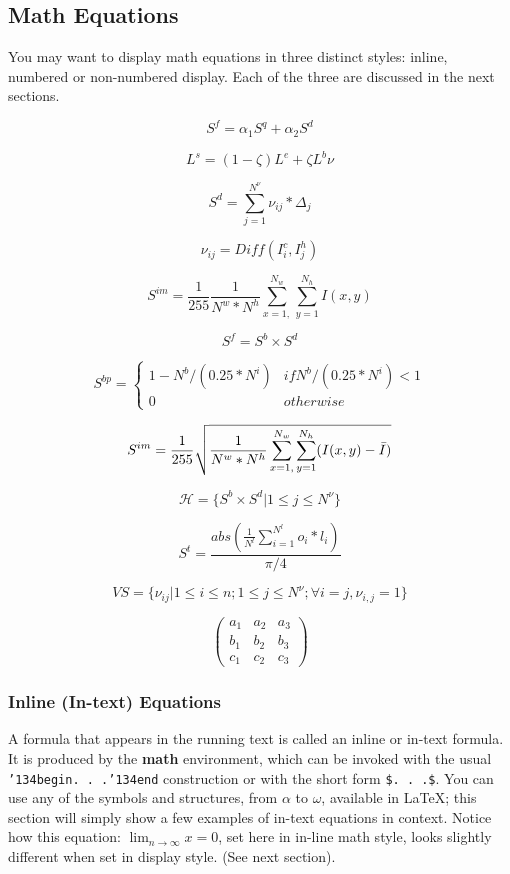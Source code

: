 \documentclass{sig-alternate}
\begin{document}
	\subsection{Math Equations}
	You may want to display math equations in three distinct styles:
	inline, numbered or non-numbered display.  Each of
	the three are discussed in the next sections.
	
	\[ S^f = \alpha_1S^q + \alpha_2S^d \]
	
	\[ L^s = (1 - \zeta)L^e + \zeta L^b\nu \]
	
	\[ S^d = \sum_{j=1}^{N^\nu} \nu_{ij} * \Delta_{j} \]
	
	\[ \nu_{ij} = Dif f(I_i^c,I_j^h) \]
	
	\[ S^{im} = \frac{1}{255} \frac{1}{N^w*N^h} \sum_{x=1,}^{N_w}\sum_{y=1}^{N_h}I(x,y) \]
	
	\[ S^f = S^b \times S^d \]
	
	\[ S^{bp} = \begin{cases} 
	1-N^b/(0.25*N^i) & if N^b/(0.25*N^i)<1 \\
	0 & otherwise 
	\end{cases}
	\]
	
	\[ S^{im} = \frac{1}{255}\sqrt{\frac{1}{N^w*N^h} \sum_{x=1,}^{N_w}\sum_{y=1}^{N_h}(I(x,y)-\Bar{I})} \]
	
	\[ \mathcal{H} = \{S^b \times S^d   |   1 \leq j \leq N^\nu\} \]
	
	\[ S^t = \frac{abs(\frac{1}{N^l}\sum_{i=1}^{N^l}o_i*l_i)}{\pi/4} \]
	
	\[ VS = \{\nu_{ij}|1 \leq i \leq n;1 \leq j \leq N^\nu; \forall i=j, \nu_{i,j}=1\} \]
	
	\[
	\begin{pmatrix} 
	a_1 & a_2 & a_3 \\ 
	b_1 & b_2 & b_3 \\ 
	c_1 & c_2 & c_3  
	\end{pmatrix}
	\]
	
	\subsubsection{Inline (In-text) Equations}
	A formula that appears in the running text is called an
	inline or in-text formula.  It is produced by the
	\textbf{math} environment, which can be
	invoked with the usual \texttt{{\char'134}begin. . .{\char'134}end}
	construction or with the short form \texttt{\$. . .\$}. You
	can use any of the symbols and structures,
	from $\alpha$ to $\omega$, available in
	\LaTeX\cite{Lamport:LaTeX}; this section will simply show a
	few examples of in-text equations in context. Notice how
	this equation: \begin{math}\lim_{n\rightarrow \infty}x=0\end{math},
	set here in in-line math style, looks slightly different when
	set in display style.  (See next section).
	
\end{document}
